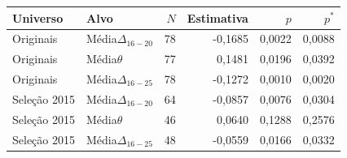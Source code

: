 \begin{tabular}{llrrrr}
\toprule
Universo & Alvo & $N$ & Estimativa & $p$ & $p^*$\\
\midrule
Originais & Média$\Delta_{16-20}$ & 78 & -0,1685 & 0,0022 & 0,0088\\
Originais & Média$\theta$ & 77 & 0,1481 & 0,0196 & 0,0392\\
Originais & Média$\Delta_{16-25}$ & 78 & -0,1272 & 0,0010 & 0,0020\\
Seleção 2015 & Média$\Delta_{16-20}$ & 64 & -0,0857 & 0,0076 & 0,0304\\
Seleção 2015 & Média$\theta$ & 46 & 0,0640 & 0,1288 & 0,2576\\
Seleção 2015 & Média$\Delta_{16-25}$ & 48 & -0,0559 & 0,0166 & 0,0332\\
\bottomrule
\end{tabular}
